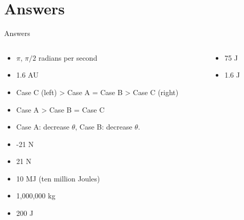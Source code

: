 \documentclass{beamer}
\begin{document}
\section{Answers}

\begin{frame}{Answers}
\begin{columns}[T]
\begin{column}{0.5\textwidth}
\begin{itemize}
\item $\pi$, $\pi/2$ radians per second
\item 1.6 AU
\item Case C (left) > Case A = Case B > Case C (right)
\item Case A > Case B = Case C
\item Case A: decrease $\theta$, Case B: decrease $\theta$.
\item -21 N
\item 21 N
\item 10 MJ (ten million Joules)
\item 1,000,000 kg
\item 200 J
\end{itemize}
\end{column}
\begin{column}{0.5\textwidth}
\begin{itemize}
\item 75 J
\item 1.6 J
\end{itemize}
\end{column}
\end{columns}
\end{frame}
\end{document}
